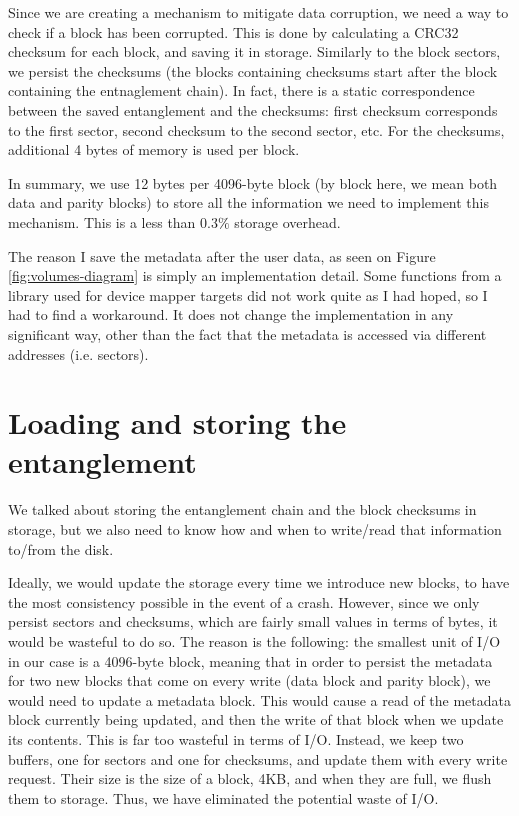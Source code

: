 \documentclass[a4paper,11pt,oneside]{report}
\begin{document}
Since we are creating a mechanism to mitigate data corruption, we need a way to check if a block has been corrupted. This is done by calculating a CRC32 checksum for each block, and saving it in storage. Similarly to the block sectors, we persist the checksums (the blocks containing checksums start after the block containing the entnaglement chain). In fact, there is a static correspondence between the saved entanglement and the checksums: first checksum corresponds to the first sector, second checksum to the second sector, etc. For the checksums, additional 4 bytes of memory is used per block.

In summary, we use 12 bytes per 4096-byte block (by block here, we mean both data and parity blocks) to store all the information we need to implement this mechanism. This is a less than $0.3\%$ storage overhead. 

The reason I save the metadata after the user data, as seen on Figure \ref{fig:volumes-diagram} is simply an implementation detail. Some functions from a library used for device mapper targets did not work quite as I had hoped, so I had to find a workaround. It does not change the implementation in any significant way, other than the fact that the metadata is accessed via different addresses (i.e. sectors). 

\section{Loading and storing the entanglement}
We talked about storing the entanglement chain and the block checksums in storage, but we also need to know how and when to write/read that information to/from the disk. 

Ideally, we would update the storage every time we introduce new blocks, to have the most consistency possible in the event of a crash. However, since we only persist sectors and checksums, which are fairly small values in terms of bytes, it would be wasteful to do so. The reason is the following: the smallest unit of I/O in our case is a 4096-byte block, meaning that in order to persist the metadata for two new blocks that come on every write (data block and parity block), we would need to update a metadata block. This would cause a read of the metadata block currently being updated, and then the write of that block when we update its contents. This is far too wasteful in terms of I/O. Instead, we keep two buffers, one for sectors and one for checksums, and update them with every write request. Their size is the size of a block, 4KB, and when they are full, we flush them to storage. Thus, we have eliminated the potential waste of I/O. 
\end{document}

